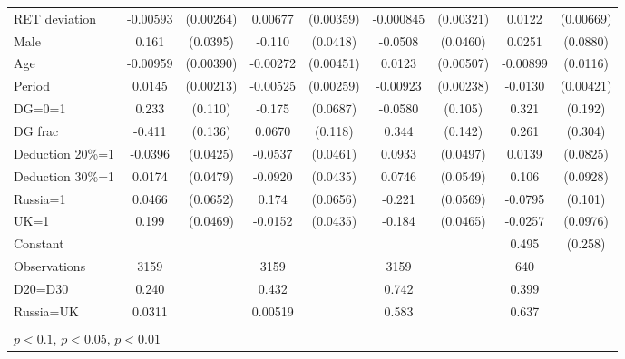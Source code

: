 \begin{tabular}{l|cccccc|cc}
RET deviation   & -0.00593\sym{**} &(0.00264)&  0.00677\sym{*}  &(0.00359)&-0.000845         &(0.00321)&   0.0122\sym{*}  &(0.00669)\\
Male            &    0.161\sym{***}& (0.0395)&   -0.110\sym{***}& (0.0418)&  -0.0508         & (0.0460)&   0.0251         & (0.0880)\\
Age             & -0.00959\sym{**} &(0.00390)& -0.00272         &(0.00451)&   0.0123\sym{**} &(0.00507)& -0.00899         & (0.0116)\\
Period          &   0.0145\sym{***}&(0.00213)& -0.00525\sym{**} &(0.00259)& -0.00923\sym{***}&(0.00238)&  -0.0130\sym{***}&(0.00421)\\
DG=0=1          &    0.233\sym{**} &  (0.110)&   -0.175\sym{**} & (0.0687)&  -0.0580         &  (0.105)&    0.321\sym{*}  &  (0.192)\\
DG frac         &   -0.411\sym{***}&  (0.136)&   0.0670         &  (0.118)&    0.344\sym{**} &  (0.142)&    0.261         &  (0.304)\\
Deduction 20\%=1&  -0.0396         & (0.0425)&  -0.0537         & (0.0461)&   0.0933\sym{*}  & (0.0497)&   0.0139         & (0.0825)\\
Deduction 30\%=1&   0.0174         & (0.0479)&  -0.0920\sym{**} & (0.0435)&   0.0746         & (0.0549)&    0.106         & (0.0928)\\
Russia=1        &   0.0466         & (0.0652)&    0.174\sym{***}& (0.0656)&   -0.221\sym{***}& (0.0569)&  -0.0795         &  (0.101)\\
UK=1            &    0.199\sym{***}& (0.0469)&  -0.0152         & (0.0435)&   -0.184\sym{***}& (0.0465)&  -0.0257         & (0.0976)\\
Constant        &                  &         &                  &         &                  &         &    0.495\sym{*}  &  (0.258)\\
\hline
Observations    &     3159         &         &     3159         &         &     3159         &         &      640         &         \\
D20=D30         &    0.240         &         &    0.432         &         &    0.742         &         &    0.399         &         \\
Russia=UK       &   0.0311         &         &  0.00519         &         &    0.583         &         &    0.637         &         \\
\hline\hline
\multicolumn{9}{p{16cm}}{\tiny }\\
\multicolumn{9}{l}{\tiny \sym{*} \(p<0.1\), \sym{**} \(p<0.05\), \sym{***} \(p<0.01\)}\\
\end{tabular}